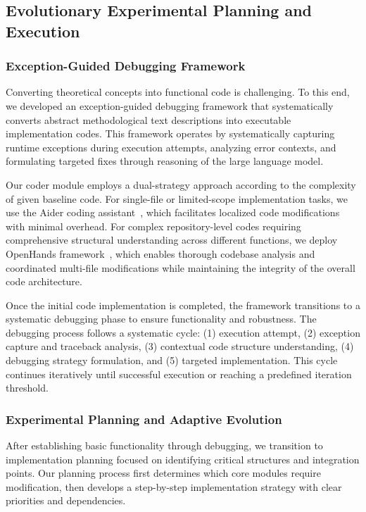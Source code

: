 \subsection{Evolutionary Experimental Planning and Execution} 
\label{sec:exp_excu}

\subsubsection{Exception-Guided Debugging Framework} Converting theoretical concepts into functional code is challenging. To this end, we developed an exception-guided debugging framework that systematically converts abstract methodological text descriptions into executable implementation codes. This framework operates by systematically capturing runtime exceptions during execution attempts, analyzing error contexts, and formulating targeted fixes through reasoning of the large language model.

Our coder module employs a dual-strategy approach according to the complexity of given baseline code. For single-file or limited-scope implementation tasks, we use the Aider coding assistant~\citep{aider}, which facilitates localized code modifications with minimal overhead. For complex repository-level codes requiring comprehensive structural understanding across different functions, we deploy OpenHands framework~\citep{openhands}, which enables thorough codebase analysis and coordinated multi-file modifications while maintaining the integrity of the overall code architecture.

Once the initial code implementation is completed, the framework transitions to a systematic debugging phase to ensure functionality and robustness. The debugging process follows a systematic cycle: (1) execution attempt, (2) exception capture and traceback analysis, (3) contextual code structure understanding, (4) debugging strategy formulation, and (5) targeted implementation. This cycle continues iteratively until successful execution or reaching a predefined iteration threshold.


\subsubsection{Experimental Planning and Adaptive Evolution} 
\label{exp_evo}

After establishing basic functionality through debugging, we transition to implementation planning focused on identifying critical structures and integration points. Our planning process first determines which core modules require modification, then develops a step-by-step implementation strategy with clear priorities and dependencies.


